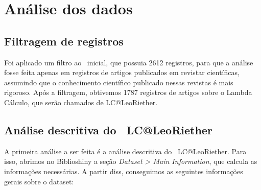 \section{Análise dos dados}

\subsection{Filtragem de registros}
Foi aplicado um filtro ao \dataset\  inicial, que possuia 2612 registros, para que a análise fosse feita apenas em registros de artigos publicados em revistar científicas, assumindo que o conhecimento científico publicado nessas revistas é mais rigoroso. Após a filtragem, obtivemos 1787 registros de artigos sobre o Lambda Cálculo, que serão chamados de LC@LeoRiether.

\subsection{Análise descritiva do \dataset\   LC@LeoRiether}

A primeira análise a ser feita é a análise descritiva do \dataset\  LC@LeoRiether. Para isso, abrimos no Biblioshiny a seção \textit{Dataset > Main Information}, que calcula as informações necessárias. A partir diss, conseguimos as seguintes informações gerais sobre o dataset:

